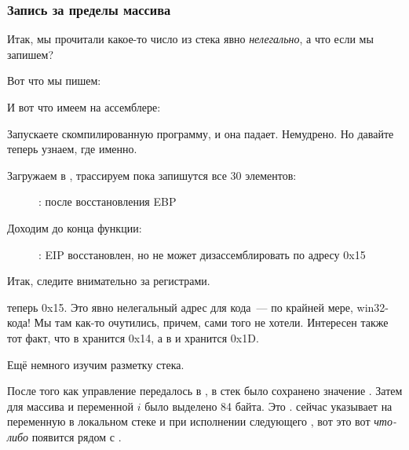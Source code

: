 \subsubsection{Запись за пределы массива}

Итак, мы прочитали какое-то число из стека явно \emph{нелегально}, а что если мы запишем?

Вот что мы пишем:




И вот что имеем на ассемблере:



Запускаете скомпилированную программу, и она падает. Немудрено. Но давайте теперь узнаем, где именно.

\clearpage
\myindex{\olly}

Загружаем в \olly, трассируем пока запишутся все 30 элементов:

\begin{figure}[H]
\centering
{}
\caption{\olly: после восстановления EBP}
\label{fig:array_BO_olly_w1}
\end{figure}

\clearpage
Доходим до конца функции:

\begin{figure}[H]
\centering
{}
\caption{\olly: EIP восстановлен, но \olly не может дизассемблировать по адресу 0x15}
\label{fig:array_BO_olly_w2}
\end{figure}

Итак, следите внимательно за регистрами.

\EIP теперь 0x15. Это явно нелегальный адрес для кода~--- по крайней мере, win32-кода! 
Мы там как-то очутились, причем, сами того не хотели. Интересен также тот факт, что в \EBP хранится 0x14, 
а в \ECX и \EDX хранится 0x1D.

Ещё немного изучим разметку стека.

После того как управление передалось в \main, в стек было сохранено значение \EBP. 
Затем для массива и переменной $i$ было выделено 84 байта. Это . 
\ESP сейчас указывает на переменную  в локальном стеке и при исполнении следующего , 
вот это вот \emph{что-либо} появится рядом с .


